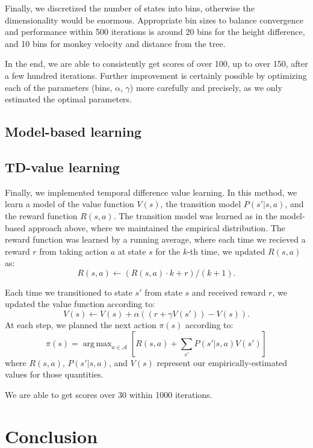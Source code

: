 \documentclass[11pt]{amsart}
\DeclareMathOperator*{\argmax}{arg\,max}
\begin{document}
Finally, we discretized the number of states into bins, otherwise the dimensionality would be enormous. Appropriate bin sizes to balance convergence and performance within 500 iterations is around 20 bins for the height difference, and 10 bins for monkey velocity and distance from the tree.

In the end, we are able to consistently get scores of over 100, up to over 150, after a few hundred iterations. Further improvement is certainly possible by optimizing each of the parameters (bins, $\alpha$, $\gamma$) more carefully and precisely, as we only estimated the optimal parameters.

\subsection{Model-based learning}

\subsection{TD-value learning}

Finally, we implemented temporal difference value learning. In this method, we learn a model of the value function $V(s)$, the transition model $P(s'|s,a)$, and the reward function $R(s,a)$. The transition model was learned as in the model-based approach above, where we maintained the empirical distribution. The reward function was learned by a running average, where each time we recieved a reward $r$ from taking action $a$ at state $s$ for the $k$-th time, we updated $R(s,a)$ as:
$$R(s,a) \gets (R(s,a) \cdot k + r)/(k + 1).$$

Each time we transitioned to state $s'$ from state $s$ and received reward $r$, we updated the value function according to:
$$V(s) \gets V(s) + \alpha ((r + \gamma V(s')) - V(s)).$$
At each step, we planned the next action $\pi(s)$ according to:
$$\pi(s) = \argmax_{a \in \mathcal{A}} \left[ R(s,a) + \sum_{s'} P(s'|s,a) V(s') \right]$$
where $R(s,a)$, $P(s'|s,a)$, and $V(s)$ represent our empirically-estimated values for those quantities.

We are able to get scores over 30 within 1000 iterations.

\section{Conclusion}


\begingroup
\begin{thebibliography}{9}


\end{thebibliography}
\endgroup
\end{document}
